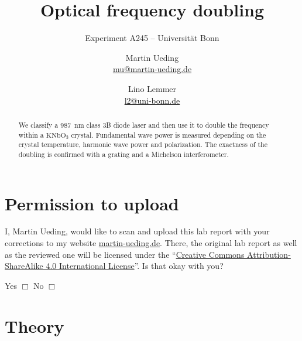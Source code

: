 \documentclass[11pt, english, fleqn, DIV=15, headinclude, BCOR=2cm]{scrreprt}
\title{Optical frequency doubling}
\subtitle{Experiment A245 -- Universität Bonn}
\author{%
    Martin Ueding \\
    \small{\href{mailto:mu@martin-ueding.de}{mu@martin-ueding.de}}
    \and
    Lino Lemmer \\
    \small{\href{mailto:l2@uni-bonn.de}{l2@uni-bonn.de}}
}
\date{\daterange{2016-05-23}{2016-05-24}}
\begin{document}
\maketitle

\begin{abstract}
    We classify a \SI{987}{\nano\meter} class 3B diode laser and then use it to
    double the frequency within a $\mathrm{KNbO_3}$ crystal. Fundamental wave
    power is measured depending on the crystal temperature, harmonic wave power
    and polarization. The exactness of the doubling is confirmed with a grating
    and a Michelson interferometer.
\end{abstract}

\tableofcontents

\chapter*{Permission to upload}

I, Martin Ueding, would like to scan and upload this lab report with your
corrections to my website \href{http://martin-ueding.de}{martin-ueding.de}.
There, the original lab report as well as the reviewed one will be licensed
under the “\href{http://creativecommons.org/licenses/by-sa/4.0/}{Creative
Commons Attribution-ShareAlike 4.0 International License}”. Is that okay with
you?

Yes $\Box$ \hspace{2cm} No $\Box$

\chapter{Theory}
\end{document}
